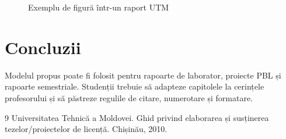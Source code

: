\documentclass{../utmreport}
\begin{document}
\begin{figure}[h]
\centering
{}
\caption{Exemplu de figură într-un raport UTM}
\label{fig:demo}
\end{figure}

\chapter{Concluzii}

Modelul propus poate fi folosit pentru rapoarte de laborator, proiecte PBL și rapoarte semestriale. Studenții trebuie să adapteze capitolele la cerințele profesorului și să păstreze regulile de citare, numerotare și formatare.

\begin{thebibliography}{9}
 Universitatea Tehnică a Moldovei. Ghid privind elaborarea și susținerea tezelor/proiectelor de licență. Chișinău, 2010.
\end{thebibliography}
\end{document}
